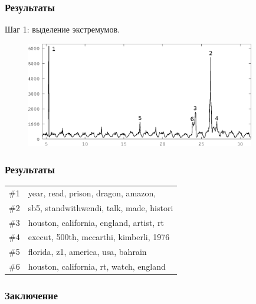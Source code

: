 \documentclass[10pt,pdf,hyperref={unicode}]{beamer}
\begin{document}
\begin{frame}
\frametitle{Результаты}
 Шаг 1: выделение экстремумов.
 \begin{figure}[H]
  \centering
  \includegraphics[width=10.0cm]{all-freq-labeled-1.eps}
  \label{fig:all-freq-labeled}
 \end{figure}
\end{frame}

\begin{frame}
\frametitle{Результаты}
\begin{table}
\begin{tabular}{r | l}
\#1 & year, read, prison, dragon, amazon, \\
\#2 & sb5, standwithwendi, talk, made, histori \\
\#3 & houston, california, england, artist, rt \\
\#4 & execut, 500th, mccarthi, kimberli, 1976 \\
\#5 & florida, z1, america, usa, bahrain \\
\#6 & houston, california, rt, watch, england \\
\end{tabular}
\end{table}	
\end{frame}

\begin{frame}
  \frametitle{Заключение}
\end{frame}
\end{document}
